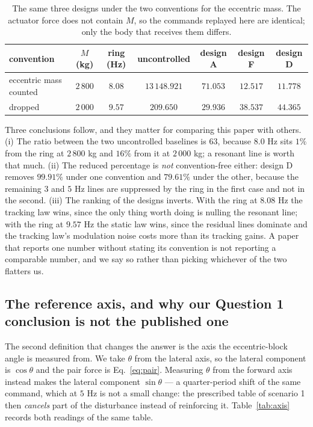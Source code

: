 \documentclass[12pt]{apmcmthesis}
\begin{document}
\begin{table}[htbp]\centering\small
\setlength{\tabcolsep}{4pt}
\caption{The same three designs under the two conventions for the eccentric mass. The actuator
force does not contain $M$, so the commands replayed here are identical; only the body that receives
them differs.}
\label{tab:convention}
\begin{tabular}{lcccccc}
\hline
convention & $M$ (kg) & ring (Hz) & uncontrolled & design A & design F & design D \\
\hline
eccentric mass counted & $2\,800$ & $8.08$ & $13\,148.921$ & $71.053$ & $12.517$ & $11.778$ \\
dropped & $2\,000$ & $9.57$ & $209.650$ & $29.936$ & $38.537$ & $44.365$ \\
\hline
\end{tabular}
\end{table}
\noindent{}Three conclusions follow, and they matter for comparing this paper with others.
(i) The ratio between the two uncontrolled baselines is $63$, because $8.0$ Hz sits $1\%$ from the
ring at $2\,800$ kg and $16\%$ from it at $2\,000$ kg; a resonant line is worth that much.
(ii) The reduced percentage is \emph{not} convention-free either: design D removes $99.91\%$ under
one convention and $79.61\%$ under the other, because the remaining $3$ and $5$ Hz lines are
suppressed by the ring in the first case and not in the second.
(iii) The ranking of the designs inverts. With the ring at $8.08$ Hz the tracking law wins, since the
only thing worth doing is nulling the resonant line; with the ring at $9.57$ Hz the static law wins,
since the residual lines dominate and the tracking law's modulation noise costs more than its
tracking gains. A paper that reports one number without stating its convention is not reporting a
comparable number, and we say so rather than picking whichever of the two flatters us.

\subsection{The reference axis, and why our Question 1 conclusion is not the published one}
\label{sec:axis}
The second definition that changes the answer is the axis the eccentric-block angle is measured from.
We take $\theta$ from the lateral axis, so the lateral component is $\cos\theta$ and the pair force is
Eq.~\eqref{eq:pair}. Measuring $\theta$ from the forward axis instead makes the lateral component
$\sin\theta$ --- a quarter-period shift of the same command, which at $5$ Hz is not a small change:
the prescribed table of scenario 1 then \emph{cancels} part of the disturbance instead of reinforcing
it. Table~\ref{tab:axis} records both readings of the same table.
\end{document}
